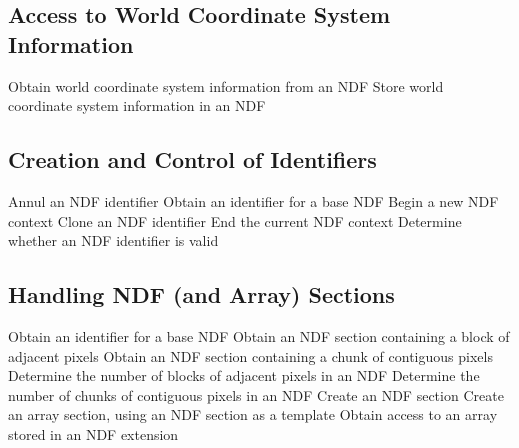 \subsection{Access to World Coordinate System Information}
            {Obtain world coordinate system information from an NDF}
            {Store world coordinate system information in an NDF}

\subsection{Creation and Control of Identifiers}

            {Annul an NDF identifier}
            {Obtain an identifier for a base NDF}
            {Begin a new NDF context}
            {Clone an NDF identifier}
            {End the current NDF context}
            {Determine whether an NDF identifier is valid}

\subsection{Handling NDF (and Array) Sections}

            {Obtain an identifier for a base NDF}
            {Obtain an NDF section containing a block of adjacent pixels}
            {Obtain an NDF section containing a chunk of contiguous pixels}
            {Determine the number of blocks of adjacent pixels in an NDF}
            {Determine the number of chunks of contiguous pixels in an NDF}
            {Create an NDF section}
            {Create an array section, using an NDF section as a template}
            {Obtain access to an array stored in an NDF extension}

